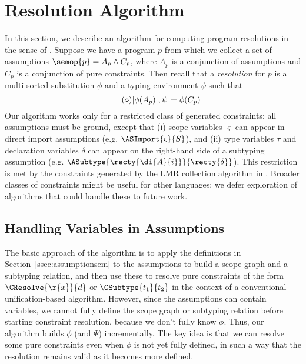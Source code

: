 \section{Resolution Algorithm}

In this section, we describe an algorithm for computing program resolutions in the sense of
.  Suppose we have a program $p$ from which we collect a set of 
assumptions $\semop{p} = A_p \wedge C_p$, where $A_p$ is a conjunction of assumptions and
$C_p$ is a conjunction of pure constraints.  Then recall that a {\em resolution} for $p$
is a multi-sorted substitution $\phi$ and a typing environment $\psi$ such that \vspace*{-2mm}
\begin{equation}\tag{$\diamond$}
  \label{eq:resoleq}
 |\phi(A_p)|,\psi \models \phi(C_p)  
\vspace*{-2mm}\end{equation}
Our algorithm works only for a restricted class of generated constraints: all
assumptions must be ground, except that (i) scope variables $\varsigma$ can appear in
direct import assumptions (e.g. $\ASImport{\varsigma}{S}$), and (ii) type variables $\tau$
and declaration variables $\delta$ can appear on the right-hand side of a subtyping assumption 
(e.g. $\ASubtype{\recty{\di{A}{i}}}{\recty{\delta}}$).
This restriction is met by the constraints generated by the LMR collection
algorithm in .  Broader classes of constraints might be
useful for other languages; we defer exploration of algorithms that could handle these
to future work. 


\subsection{Handling Variables in Assumptions}

The basic approach of the algorithm is to apply the definitions in Section~\ref{ssec:assumptionsem} to the
assumptions to build a scope graph and a subtyping relation, and then use these 
to resolve pure constraints of the form $\CResolve{\r{x}}{d}$ or $\CSubtype{t_1}{t_2}$ in the context of a 
conventional unification-based algorithm.
However, since the assumptions can contain variables, we cannot fully define the scope graph or subtyping
relation before starting constraint resolution, because we don't fully know $\phi$. 
Thus, our algorithm builds $\phi$ (and $\Psi$) incrementally.  The key idea is that
we can resolve some pure constraints even when $\phi$ is not yet fully defined,
in such a way that the resolution remains valid as it becomes more defined.

